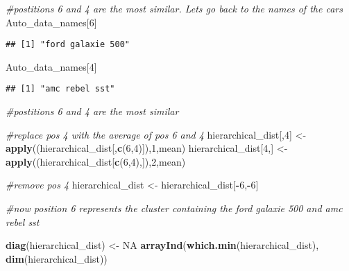 \documentclass[11pt,]{article}
\newenvironment{Shaded}{\begin{snugshade}}{\end{snugshade}}
\newcommand{\CommentTok}[1]{\textcolor[rgb]{0.56,0.35,0.01}{\textit{#1}}}
\newcommand{\DecValTok}[1]{\textcolor[rgb]{0.00,0.00,0.81}{#1}}
\newcommand{\KeywordTok}[1]{\textcolor[rgb]{0.13,0.29,0.53}{\textbf{#1}}}
\newcommand{\NormalTok}[1]{#1}
\newcommand{\OperatorTok}[1]{\textcolor[rgb]{0.81,0.36,0.00}{\textbf{#1}}}
\newcommand{\OtherTok}[1]{\textcolor[rgb]{0.56,0.35,0.01}{#1}}
\newcommand{\StringTok}[1]{\textcolor[rgb]{0.31,0.60,0.02}{#1}}
\begin{document}
\begin{Shaded}
\begin{Highlighting}[]
\CommentTok{#postitions 6 and 4 are the most similar. Lets go back to the names of the cars}
\NormalTok{Auto_data_names[}\DecValTok{6}\NormalTok{]}
\end{Highlighting}
\end{Shaded}

\begin{verbatim}
## [1] "ford galaxie 500"
\end{verbatim}

\begin{Shaded}
\begin{Highlighting}[]
\NormalTok{Auto_data_names[}\DecValTok{4}\NormalTok{]}
\end{Highlighting}
\end{Shaded}

\begin{verbatim}
## [1] "amc rebel sst"
\end{verbatim}

\begin{Shaded}
\begin{Highlighting}[]
\CommentTok{#postitions 6 and 4 are the most similar}

\CommentTok{#replace pos 4 with the average of pos 6 and 4}
\NormalTok{hierarchical_dist[,}\DecValTok{4}\NormalTok{] <-}\StringTok{ }\KeywordTok{apply}\NormalTok{((hierarchical_dist[,}\KeywordTok{c}\NormalTok{(}\DecValTok{6}\NormalTok{,}\DecValTok{4}\NormalTok{)]),}\DecValTok{1}\NormalTok{,mean)}
\NormalTok{hierarchical_dist[}\DecValTok{4}\NormalTok{,] <-}\StringTok{ }\KeywordTok{apply}\NormalTok{((hierarchical_dist[}\KeywordTok{c}\NormalTok{(}\DecValTok{6}\NormalTok{,}\DecValTok{4}\NormalTok{),]),}\DecValTok{2}\NormalTok{,mean)}

\CommentTok{#remove pos 4}
\NormalTok{hierarchical_dist <-}\StringTok{ }\NormalTok{hierarchical_dist[}\OperatorTok{-}\DecValTok{6}\NormalTok{,}\OperatorTok{-}\DecValTok{6}\NormalTok{]}

\CommentTok{#now position 6 represents the cluster containing the ford galaxie 500 and amc rebel sst}
\end{Highlighting}
\end{Shaded}

\begin{Shaded}
\begin{Highlighting}[]
\KeywordTok{diag}\NormalTok{(hierarchical_dist) <-}\StringTok{ }\OtherTok{NA}
\KeywordTok{arrayInd}\NormalTok{(}\KeywordTok{which.min}\NormalTok{(hierarchical_dist), }\KeywordTok{dim}\NormalTok{(hierarchical_dist))}
\end{Highlighting}
\end{Shaded}
\end{document}
